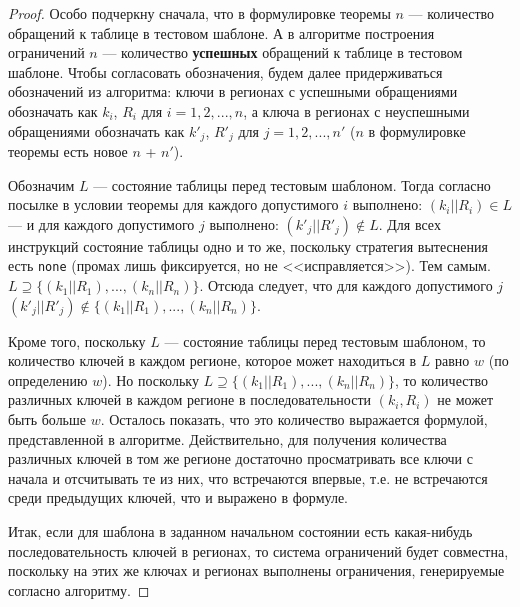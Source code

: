 \theoremtext{\ref{mirror_fullness_none}}{\FullnessMirrorNone}
\begin{proof}
  Особо подчеркну сначала, что в формулировке теоремы $n$ --- количество обращений к таблице в тестовом шаблоне. А в алгоритме построения ограничений $n$ --- количество \textbf{успешных} обращений к таблице в тестовом шаблоне. Чтобы согласовать обозначения, будем далее придерживаться обозначений из алгоритма: ключи в регионах с успешными обращениями обозначать как $k_i$, $R_i$ для $i = 1, 2, ..., n$, а ключа в регионах с неуспешными обращениями обозначать как $k'_j$, $R'_j$ для $j = 1, 2, ..., n'$ ($n$ в формулировке теоремы есть новое $n$ + $n'$).

  Обозначим $L$ --- состояние таблицы перед тестовым шаблоном. Тогда согласно посылке в условии теоремы для каждого допустимого $i$ выполнено: $(k_i || R_i) \in L$ --- и для каждого допустимого $j$ выполнено: $(k'_j || R'_j) \notin L$. Для всех инструкций состояние таблицы одно и то же, поскольку стратегия вытеснения есть \texttt{none} (промах лишь фиксируется, но не <<исправляется>>). Тем самым. $L \supseteq \{ (k_1||R_1), ..., (k_n||R_n) \}$. Отсюда следует, что для каждого допустимого $j$ $(k'_j||R'_j) \notin \{ (k_1||R_1), ..., (k_n||R_n) \}$.

  Кроме того, поскольку $L$ --- состояние таблицы перед тестовым шаблоном, то количество ключей в каждом регионе, которое может находиться в $L$ равно $w$ (по определению $w$). Но поскольку $L \supseteq \{ (k_1||R_1), ..., (k_n||R_n) \}$, то количество различных ключей в каждом регионе в последовательности $(k_i, R_i)$ не может быть больше $w$. Осталось показать, что это количество выражается формулой, представленной в алгоритме. Действительно, для получения количества различных ключей в том же регионе достаточно просматривать все ключи с начала и отсчитывать те из них, что встречаются впервые, т.е. не встречаются среди предыдущих ключей, что и выражено в формуле.

  Итак, если для шаблона в заданном начальном состоянии есть какая-нибудь последовательность ключей в регионах, то система ограничений будет совместна, поскольку на этих же ключах и регионах выполнены ограничения, генерируемые согласно алгоритму.
\end{proof}

